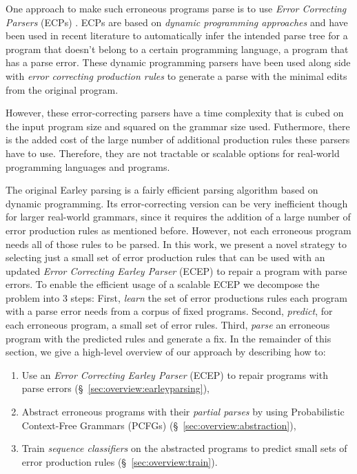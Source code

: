 One approach to make such erroneous programs parse is to use \emph{Error
Correcting Parsers} (ECPs) \citep{Aho_1972}. ECPs are based on \emph{dynamic
programming approaches} and have been used in recent literature to automatically
infer the intended parse tree for a program that doesn't belong to a certain
programming language, \ie a program that has a parse error. These dynamic
programming parsers have been used along side with \emph{error correcting
production rules} \citep{Aho_1972} to generate a parse with the minimal edits
from the original program.

However, these error-correcting parsers have a time complexity that is cubed on
the input program size and squared on the grammar size used. Futhermore, there
is the added cost of the large number of additional production rules these
parsers have to use. Therefore, they are not tractable or scalable options for
real-world programming languages and programs.


The original Earley parsing is a fairly efficient parsing algorithm
\citep{Earley_1970} based on dynamic programming. Its error-correcting version
can be very inefficient though for larger real-world grammars, since it requires
the addition of a large number of error production rules as mentioned before.
However, not each erroneous program needs all of those rules to be parsed. In
this work, we present a novel strategy to selecting just a small set of error
production rules that can be used with an updated \emph{Error Correcting Earley
Parser} (ECEP) to repair a program with parse errors.
%
To enable the efficient usage of a scalable ECEP we decompose the problem into 3
steps:
%
First, \emph{learn} the set of error productions rules each program with a parse
error needs from a corpus of fixed programs.
%
Second, \emph{predict}, for each erroneous program, a small set of error rules.
%
Third, \emph{parse} an erroneous program with the predicted rules and generate a
fix.
%
In the remainder of this section, we give a high-level overview
of our approach by describing how to:

\begin{enumerate}

  \item Use an \emph{Error Correcting Earley Parser} (ECEP) to repair programs
  with parse errors (\S~\ref{sec:overview:earleyparsing}),

  \item Abstract erroneous programs with their \emph{partial parses} by using
  Probabilistic Context-Free Grammars (PCFGs)
  (\S~\ref{sec:overview:abstraction}),

  \item Train \emph{sequence classifiers} on the abstracted programs to predict
  small sets of error production rules (\S~\ref{sec:overview:train}).

\end{enumerate}

